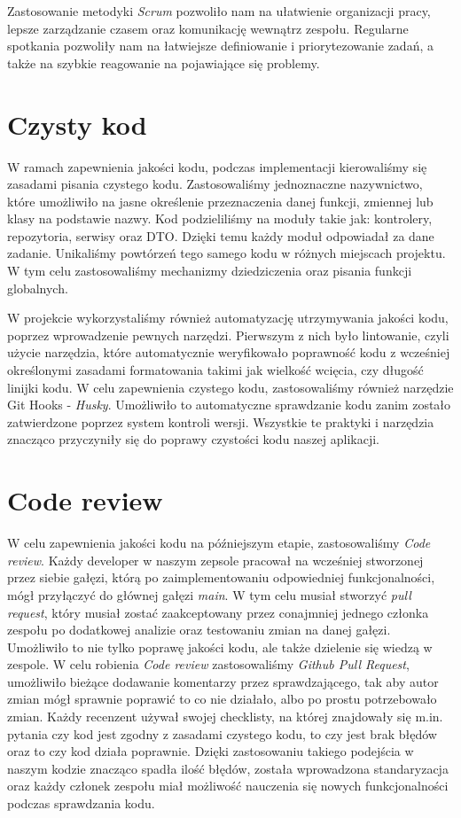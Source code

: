Zastosowanie metodyki \emph{Scrum} pozwoliło nam na ułatwienie organizacji pracy, lepsze zarządzanie czasem oraz komunikację wewnątrz zespołu. Regularne spotkania pozwoliły nam na łatwiejsze definiowanie i priorytezowanie zadań, a także na szybkie reagowanie na pojawiające się problemy.

\section{Czysty kod}
W ramach zapewnienia jakości kodu, podczas implementacji kierowaliśmy się zasadami pisania czystego kodu. Zastosowaliśmy jednoznaczne nazywnictwo, które umożliwiło na jasne określenie przeznaczenia danej funkcji, zmiennej lub klasy na podstawie nazwy.
Kod podzieliliśmy na moduły takie jak: kontrolery, repozytoria, serwisy oraz DTO. Dzięki temu każdy moduł odpowiadał za dane zadanie. Unikaliśmy powtórzeń tego samego kodu w różnych miejscach projektu. W tym celu zastosowaliśmy mechanizmy dziedziczenia oraz pisania funkcji globalnych.

W projekcie wykorzystaliśmy również automatyzację utrzymywania jakości kodu, poprzez wprowadzenie pewnych narzędzi. Pierwszym z nich było lintowanie, czyli użycie narzędzia, które automatycznie weryfikowało poprawność kodu z wcześniej określonymi zasadami formatowania takimi jak wielkość wcięcia, czy długość linijki kodu.
W celu zapewnienia czystego kodu, zastosowaliśmy również narzędzie Git Hooks - \emph{Husky}. Umożliwiło to automatyczne sprawdzanie kodu zanim zostało zatwierdzone poprzez system kontroli wersji. Wszystkie te praktyki i narzędzia znacząco przyczyniły się do poprawy czystości kodu naszej aplikacji.

\section{Code review}
W celu zapewnienia jakości kodu na późniejszym etapie, zastosowaliśmy \emph{Code review}. Każdy developer w naszym zepsole pracował na wcześniej stworzonej przez siebie gałęzi, którą po zaimplementowaniu odpowiedniej funkcjonalności, mógł przyłączyć do głównej gałęzi \emph{main}. W tym celu musiał stworzyć \emph{pull request},
który musiał zostać zaakceptowany przez conajmniej jednego członka zespołu po dodatkowej analizie oraz testowaniu zmian na danej gałęzi. Umożliwiło to nie tylko poprawę jakości kodu, ale także dzielenie się wiedzą w zespole. W celu robienia \emph{Code review} zastosowaliśmy \emph{Github Pull Request}, umożliwiło bieżące dodawanie komentarzy przez sprawdzającego, tak aby
autor zmian mógł sprawnie poprawić to co nie działało, albo po prostu potrzebowało zmian. Każdy recenzent używał swojej checklisty, na której znajdowały się m.in. pytania czy kod jest zgodny z zasadami czystego kodu, to czy jest brak błędów oraz to czy kod działa poprawnie. Dzięki zastosowaniu takiego podejścia w naszym kodzie znacząco spadła ilość błędów, została wprowadzona standaryzacja oraz każdy
członek zespołu miał możliwość nauczenia się nowych funkcjonalności podczas sprawdzania kodu.

